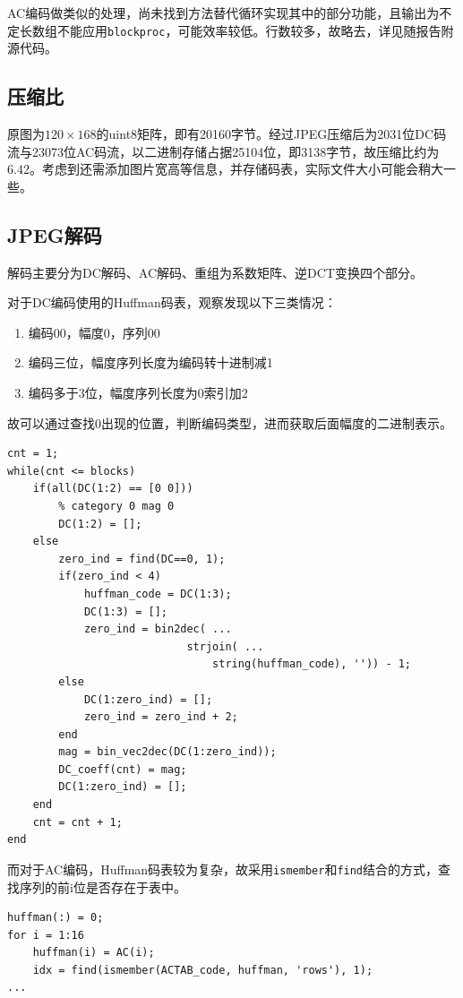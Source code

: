 \documentclass[10pt, a4paper]{article}
\begin{document}
AC编码做类似的处理，尚未找到方法替代循环实现其中的部分功能，且输出为不定长数组不能应用\texttt{blockproc}，可能效率较低。行数较多，故略去，详见随报告附源代码。

\subsection{压缩比}

原图为$120\times168$的uint8矩阵，即有20160字节。经过JPEG压缩后为2031位DC码流与23073位AC码流，以二进制存储占据25104位，即3138字节，故压缩比约为6.42。考虑到还需添加图片宽高等信息，并存储码表，实际文件大小可能会稍大一些。

\subsection{JPEG解码}

解码主要分为DC解码、AC解码、重组为系数矩阵、逆DCT变换四个部分。

对于DC编码使用的Huffman码表，观察发现以下三类情况：

\begin{enumerate}
    \item 编码00，幅度0，序列00
    \item 编码三位，幅度序列长度为编码转十进制减1
    \item 编码多于3位，幅度序列长度为0索引加2
\end{enumerate}

故可以通过查找0出现的位置，判断编码类型，进而获取后面幅度的二进制表示。

\begin{verbatim}
cnt = 1;
while(cnt <= blocks)
    if(all(DC(1:2) == [0 0]))
        % category 0 mag 0
        DC(1:2) = [];
    else
        zero_ind = find(DC==0, 1);
        if(zero_ind < 4)
            huffman_code = DC(1:3);
            DC(1:3) = [];
            zero_ind = bin2dec( ...
                            strjoin( ...
                                string(huffman_code), '')) - 1;
        else
            DC(1:zero_ind) = [];
            zero_ind = zero_ind + 2;
        end
        mag = bin_vec2dec(DC(1:zero_ind));
        DC_coeff(cnt) = mag;
        DC(1:zero_ind) = [];
    end
    cnt = cnt + 1;
end
\end{verbatim}

而对于AC编码，Huffman码表较为复杂，故采用\texttt{ismember}和\texttt{find}结合的方式，查找序列的前i位是否存在于表中。

\begin{verbatim}
huffman(:) = 0;
for i = 1:16
    huffman(i) = AC(i);
    idx = find(ismember(ACTAB_code, huffman, 'rows'), 1);
...
\end{verbatim}
\end{document}
